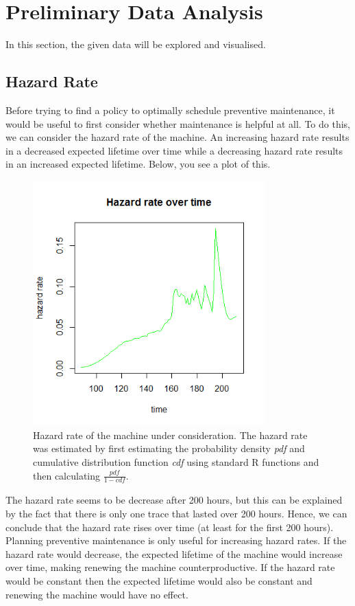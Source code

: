 \section{Preliminary Data Analysis}
In this section, the given data will be explored and visualised.

\subsection{Hazard Rate}
Before trying to find a policy to optimally schedule preventive maintenance, it would be useful to first consider whether maintenance is helpful at all. To do this, we can consider the hazard rate of the machine. An increasing hazard rate results in a decreased expected lifetime over time while a decreasing hazard rate results in an increased expected lifetime. Below, you see a plot of this.
\begin{figure}[H]
\centering
\includegraphics[width=0.8\textwidth]{Plots/HazardRate.png}
\caption{Hazard rate of the machine under consideration. The hazard rate was estimated by first estimating the probability density \textit{pdf} and cumulative distribution function \textit{cdf} using standard R functions and then calculating $\frac{\textit{pdf}}{1-\textit{cdf}}$.}
\end{figure}
The hazard rate seems to be decrease after 200 hours, but this can be explained by the fact that there is only one trace that lasted over 200 hours. Hence, we can conclude that the hazard rate rises over time (at least for the first 200 hours). Planning preventive maintenance is only useful for increasing hazard rates. If the hazard rate would decrease, the expected lifetime of the machine would increase over time, making renewing the machine counterproductive. If the hazard rate would be constant then the expected lifetime would also be constant and renewing the machine would have no effect.\\

